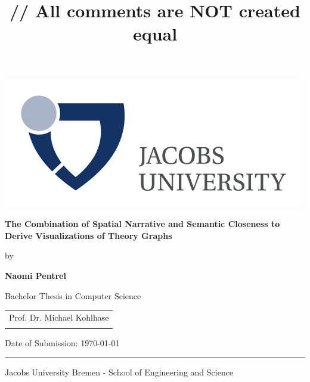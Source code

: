 \documentclass[twoside, 12pt]{article}
\title{\vspace{-15mm}\fontsize{24pt}{10pt}\selectfont\textbf{// All comments are NOT created equal}} %
\begin{document}
\thispagestyle{empty}
\begin{flushright}
    \includegraphics[scale=1.0]{assets/Logo}
  \end{flushright}
  \vspace{20mm}
  \begin{center}
    \huge
    \textbf{The Combination of Spatial Narrative and Semantic Closeness to Derive Visualizations of Theory Graphs}
  \end{center}
  \vspace*{4mm}
  \begin{center}
   \Large by
  \end{center}
  \vspace*{4mm}
  \begin{center}
    \Large
    \textbf{Naomi Pentrel}
  \end{center}
  \vspace*{20mm}
  \begin{center}
    \large
    Bachelor Thesis in Computer Science
  \end{center}
  \vfill
  \begin{flushright}
    \large
    \begin{tabular}{l}
      
      \hline
      Prof. Dr. Michael Kohlhase \\
      \\
    \end{tabular}
  \end{flushright}
  \vspace*{8mm}
  \begin{flushleft}
    \large
    Date of Submission: \today \\
    \rule{\textwidth}{1pt}
  \end{flushleft}
  \begin{center}
    \Large Jacobs University Bremen - School of Engineering and Science
  \end{center}
\end{document}
